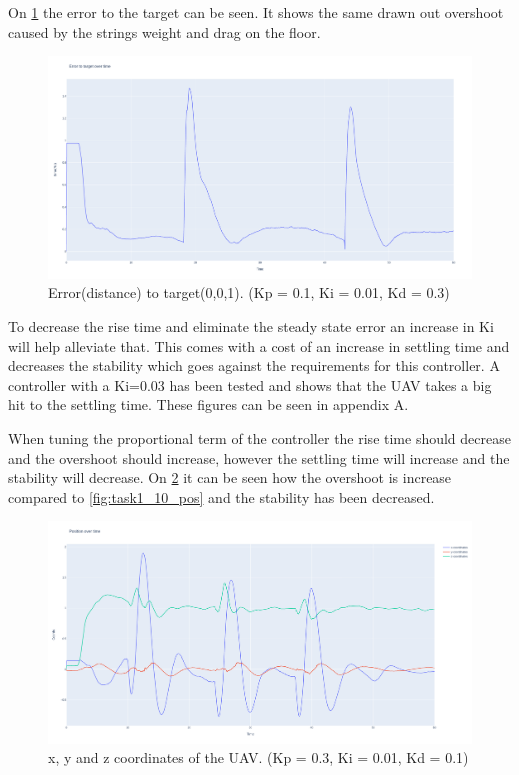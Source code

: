 \documentclass[conference]{IEEEtran}
\begin{document}
On \cref{fig:task1_11_err} the error to the target can be seen. It shows the same drawn out overshoot caused by the strings weight and drag on the floor.

\begin{figure}[hbtp]
	\centering
	\includegraphics[width=1.0\linewidth]{images/task1_11_err.png}
	\caption{Error(distance) to target(0,0,1). (Kp = 0.1, Ki = 0.01, Kd = 0.3)}
	\label{fig:task1_11_err}
\end{figure}

To decrease the rise time and eliminate the steady state error an increase in Ki will help alleviate that. This comes with a cost of an increase in settling time and decreases the stability which goes against the requirements for this controller. A controller with a Ki=0.03 has been tested and shows that the UAV takes a big hit to the settling time. These figures can be seen in appendix A.

When tuning the proportional term of the controller the rise time should decrease and the overshoot should increase, however the settling time will increase and the stability will decrease. On \cref{fig:task1_4_pos} it can be seen how the overshoot is increase compared to \cref{fig:task1_10_pos} and the stability has been decreased. 

\begin{figure}[hbtp]
	\centering
	\includegraphics[width=1.0\linewidth]{images/task1_4_pos.png}
	\caption{x, y and z coordinates of the UAV. (Kp = 0.3, Ki = 0.01, Kd = 0.1)}
	\label{fig:task1_4_pos}
\end{figure}
\end{document}
